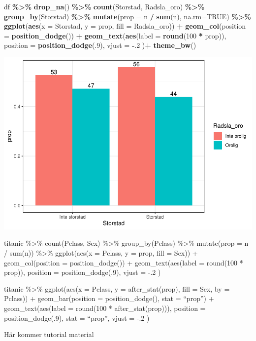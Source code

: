 \documentclass[
]{book}
\newenvironment{Shaded}{\begin{snugshade}}{\end{snugshade}}
\newcommand{\AttributeTok}[1]{\textcolor[rgb]{0.13,0.29,0.53}{#1}}
\newcommand{\ConstantTok}[1]{\textcolor[rgb]{0.56,0.35,0.01}{#1}}
\newcommand{\DecValTok}[1]{\textcolor[rgb]{0.00,0.00,0.81}{#1}}
\newcommand{\FunctionTok}[1]{\textcolor[rgb]{0.13,0.29,0.53}{\textbf{#1}}}
\newcommand{\NormalTok}[1]{#1}
\newcommand{\SpecialCharTok}[1]{\textcolor[rgb]{0.81,0.36,0.00}{\textbf{#1}}}
\begin{document}
\begin{Shaded}
\begin{Highlighting}[]
\NormalTok{df }\SpecialCharTok{\%\textgreater{}\%}
  \FunctionTok{drop\_na}\NormalTok{() }\SpecialCharTok{\%\textgreater{}\%} 
  \FunctionTok{count}\NormalTok{(Storstad, Radsla\_oro) }\SpecialCharTok{\%\textgreater{}\%} 
  \FunctionTok{group\_by}\NormalTok{(Storstad) }\SpecialCharTok{\%\textgreater{}\%}
  \FunctionTok{mutate}\NormalTok{(}\AttributeTok{prop =}\NormalTok{ n }\SpecialCharTok{/} \FunctionTok{sum}\NormalTok{(n), }\AttributeTok{na.rm=}\ConstantTok{TRUE}\NormalTok{) }\SpecialCharTok{\%\textgreater{}\%}
  \FunctionTok{ggplot}\NormalTok{(}\FunctionTok{aes}\NormalTok{(}\AttributeTok{x =}\NormalTok{ Storstad, }\AttributeTok{y =}\NormalTok{ prop, }\AttributeTok{fill =}\NormalTok{ Radsla\_oro)) }\SpecialCharTok{+}
  \FunctionTok{geom\_col}\NormalTok{(}\AttributeTok{position =} \FunctionTok{position\_dodge}\NormalTok{()) }\SpecialCharTok{+}
  \FunctionTok{geom\_text}\NormalTok{(}\FunctionTok{aes}\NormalTok{(}\AttributeTok{label =} \FunctionTok{round}\NormalTok{(}\DecValTok{100} \SpecialCharTok{*}\NormalTok{ prop)),}
            \AttributeTok{position =} \FunctionTok{position\_dodge}\NormalTok{(.}\DecValTok{9}\NormalTok{), }\AttributeTok{vjust =} \SpecialCharTok{{-}}\NormalTok{.}\DecValTok{2}
\NormalTok{  )}\SpecialCharTok{+}
  \FunctionTok{theme\_bw}\NormalTok{()}
\end{Highlighting}
\end{Shaded}

\includegraphics{_main_files/figure-latex/unnamed-chunk-19-1.pdf}

titanic \%\textgreater\%
count(Pclass, Sex) \%\textgreater\%
group\_by(Pclass) \%\textgreater\%
mutate(prop = n / sum(n)) \%\textgreater\%
ggplot(aes(x = Pclass, y = prop, fill = Sex)) +
geom\_col(position = position\_dodge()) +
geom\_text(aes(label = round(100 * prop)),
position = position\_dodge(.9), vjust = -.2
)

titanic \%\textgreater\%
ggplot(aes(x = Pclass, y = after\_stat(prop), fill = Sex, by = Pclass)) +
geom\_bar(position = position\_dodge(), stat = ``prop'') +
geom\_text(aes(label = round(100 * after\_stat(prop))),
position = position\_dodge(.9), stat = ``prop'', vjust = -.2
)

Här kommer tutorial material

  
\end{document}
